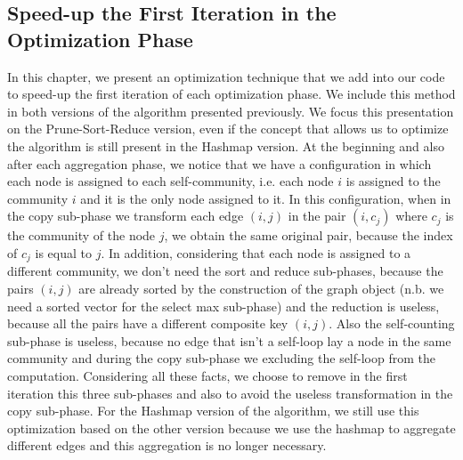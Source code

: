 \subsection{Speed-up the First Iteration in the Optimization Phase}\label{f-1}
In this chapter, we present an optimization technique that we add into our code to speed-up the first iteration of each optimization phase. We include this method in both versions of the algorithm presented previously. We focus this presentation on the Prune-Sort-Reduce version, even if the concept that allows us to optimize the algorithm is still present in the Hashmap version. At the beginning and also after each aggregation phase, we notice that we have a configuration in which each node is assigned to each self-community, i.e. each node $i$ is assigned to the community $i$ and it is the only node assigned to it. In this configuration, when in the copy sub-phase we transform each edge $(i,j)$ in the pair $(i,c_j)$ where $c_j$ is the community of the node $j$, we obtain the same original pair, because the index of $c_j$ is equal to $j$. In addition, considering that each node is assigned to a different community, we don't need the sort and reduce sub-phases, because the pairs $(i, j)$ are already sorted by the construction of the graph object (n.b. we need a sorted vector for the select max sub-phase) and the reduction is useless, because all the pairs have a different composite key $(i, j)$.
Also the self-counting sub-phase is useless, because no edge that isn't a self-loop lay a node in the same community and during the copy sub-phase we excluding the self-loop from the computation. 
Considering all these facts, we choose to remove in the first iteration this three sub-phases and also to avoid the useless transformation in the copy sub-phase. For the Hashmap version of the algorithm, we still use this optimization based on the other version because we use the hashmap to aggregate different edges and this aggregation is no longer necessary.

